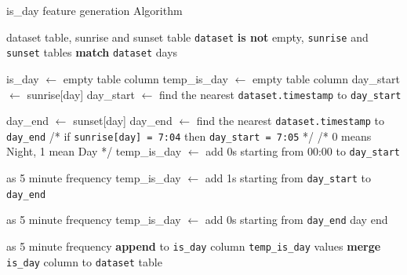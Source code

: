 \begin{algorithm}[H]
	\caption{is\_day feature generation Algorithm}\label{alg:isday}
	\begin{algorithmic}
		\Require dataset table, sunrise and sunset table
		\Ensure \texttt{dataset} \textbf{is not} empty, \texttt{sunrise} and \texttt{sunset} tables \textbf{match} \texttt{dataset} days

		\State is\_day $\gets$ empty table column
		\State temp\_is\_day $\gets$ empty table column
		\State day\_start $\gets$ sunrise[day] 
		\State day\_start $\gets$ find the nearest \texttt{dataset.timestamp} to \texttt{day\_start}

		\State day\_end $\gets$ sunset[day]
		\State day\_end $\gets$ find the nearest \texttt{dataset.timestamp} to \texttt{day\_end}
		\State /* if \texttt{sunrise[day] = 7:04} then \texttt{day\_start = 7:05} */
		\State
		\State /* 0 means Night, 1 mean Day */
		\State temp\_is\_day $\gets$ add 0s starting from 00:00 to \texttt{day\_start}

		as 5 minute frequency
		\State temp\_is\_day $\gets$ add 1s starting from \texttt{day\_start} to \texttt{day\_end}

		as 5 minute frequency
		\State temp\_is\_day $\gets$ add 0s starting from \texttt{day\_end} day end

		as 5 minute frequency
		\State \textbf{append} to \texttt{is\_day} column \texttt{temp\_is\_day} values
		\EndFor
		\State \textbf{merge} \texttt{is\_day} column to \texttt{dataset} table
	\end{algorithmic}
\end{algorithm}

%
%
%
%


